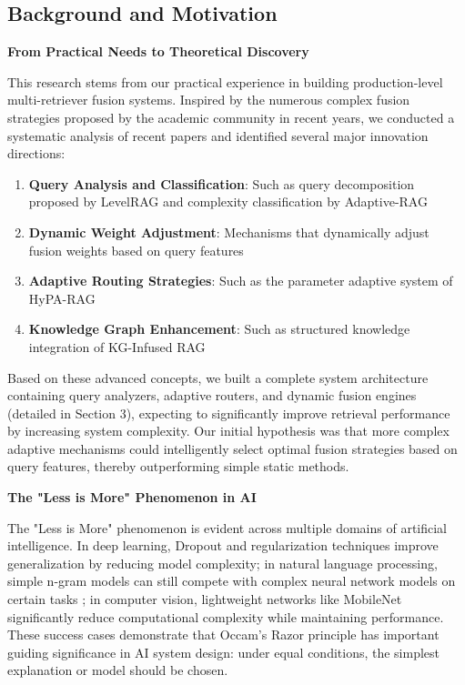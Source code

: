 \documentclass[letterpaper]{article} %
\begin{document}
\subsection{Background and Motivation}

\textbf{From Practical Needs to Theoretical Discovery}

This research stems from our practical experience in building production-level multi-retriever fusion systems. Inspired by the numerous complex fusion strategies proposed by the academic community in recent years, we conducted a systematic analysis of recent papers and identified several major innovation directions:

\begin{enumerate}
\item \textbf{Query Analysis and Classification}: Such as query decomposition proposed by LevelRAG \cite{jiang2023levelrag} and complexity classification by Adaptive-RAG \cite{jeong2024adaptive}
\item \textbf{Dynamic Weight Adjustment}: Mechanisms that dynamically adjust fusion weights based on query features
\item \textbf{Adaptive Routing Strategies}: Such as the parameter adaptive system of HyPA-RAG \cite{su2024hypa}
\item \textbf{Knowledge Graph Enhancement}: Such as structured knowledge integration of KG-Infused RAG \cite{edge2024kg}
\end{enumerate}

Based on these advanced concepts, we built a complete system architecture containing query analyzers, adaptive routers, and dynamic fusion engines (detailed in Section 3), expecting to significantly improve retrieval performance by increasing system complexity. Our initial hypothesis was that more complex adaptive mechanisms could intelligently select optimal fusion strategies based on query features, thereby outperforming simple static methods.

\textbf{The "Less is More" Phenomenon in AI}

The "Less is More" phenomenon is evident across multiple domains of artificial intelligence. In deep learning, Dropout \cite{srivastava2014dropout} and regularization techniques improve generalization by reducing model complexity; in natural language processing, simple n-gram models can still compete with complex neural network models on certain tasks \cite{chen1999empirical}; in computer vision, lightweight networks like MobileNet \cite{howard2017mobilenets} significantly reduce computational complexity while maintaining performance. These success cases demonstrate that Occam's Razor principle \cite{domingos1999role,baker2016simplicity} has important guiding significance in AI system design: under equal conditions, the simplest explanation or model should be chosen.
\end{document}
